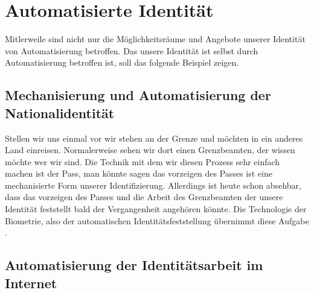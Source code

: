 \section {Automatisierte Identität}

Mitlerweile sind nicht nur die Möglichkeitsräume und Angebote unserer Identität von Automatisierung betroffen.
Das unsere Identität ist selbst durch Automatisierung betroffen ist, soll das folgende Beispiel zeigen.

\subsection {Mechanisierung und Automatisierung der Nationalidentität}

Stellen wir uns einmal vor wir stehen an der Grenze und möchten in ein anderes Land einreisen.
Normalerweise sehen wir dort einen Grenzbeamten, der wissen möchte wer wir sind.
Die Technik mit dem wir diesen Prozess sehr einfach machen ist der Pass, man könnte sagen das vorzeigen des Passes ist eine mechanisierte Form unserer Identifizierung.
Allerdings ist heute schon absehbar, dass das vorzeigen des Passes und die Arbeit des Grenzbeamten der unsere Identität feststellt bald der Vergangenheit angehören könnte.
Die Technologie der Biometrie, also der automatischen Identitätsfeststellung übernimmt diese Aufgabe \parencite{knaut}.

\subsection {Automatisierung der Identitätsarbeit im Internet}

